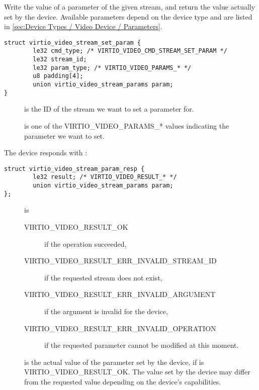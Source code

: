 Write the value of a parameter of the given stream, and return the value
actually set by the device. Available parameters depend on the device
type and are listed in
\ref{sec:Device Types / Video Device / Parameters}.

\begin{lstlisting}
struct virtio_video_stream_set_param {
        le32 cmd_type; /* VIRTIO_VIDEO_CMD_STREAM_SET_PARAM */
        le32 stream_id;
        le32 param_type; /* VIRTIO_VIDEO_PARAMS_* */
        u8 padding[4];
        union virtio_video_stream_params param;
}
\end{lstlisting}

\begin{description}
\item[]
is the ID of the stream we want to set a parameter for.
\item[]
is one of the VIRTIO\_VIDEO\_PARAMS\_* values indicating the parameter
we want to set.
\end{description}

The device responds with :

\begin{lstlisting}
struct virtio_video_stream_param_resp {
        le32 result; /* VIRTIO_VIDEO_RESULT_* */
        union virtio_video_stream_params param;
};
\end{lstlisting}

\begin{description}
\item[]
is

\begin{description}
\item[VIRTIO\_VIDEO\_RESULT\_OK]
if the operation succeeded,
\item[VIRTIO\_VIDEO\_RESULT\_ERR\_INVALID\_STREAM\_ID]
if the requested stream does not exist,
\item[VIRTIO\_VIDEO\_RESULT\_ERR\_INVALID\_ARGUMENT]
if the  argument is invalid for the device,
\item[VIRTIO\_VIDEO\_RESULT\_ERR\_INVALID\_OPERATION]
if the requested parameter cannot be modified at this moment.
\end{description}
\item[]
is the actual value of the parameter set by the device, if
 is VIRTIO\_VIDEO\_RESULT\_OK. The value set by the device
may differ from the requested value depending on the device's
capabilities.
\end{description}

